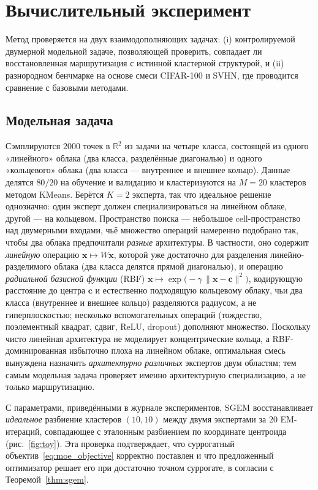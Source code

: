 \chapter{Вычислительный эксперимент}
\label{ch:experiments}

Метод проверяется на двух взаимодополняющих задачах: (i) контролируемой
двумерной модельной задаче, позволяющей проверить, совпадает ли
восстановленная маршрутизация с истинной кластерной структурой, и
(ii) разнородном бенчмарке на основе смеси CIFAR-100 и SVHN, где
проводится сравнение с базовыми методами.

\section{Модельная задача}
\label{sec:toy}

Сэмплируются $2000$ точек в $\mathbb{R}^2$ из задачи на четыре класса,
состоящей из одного «линейного» облака (два класса, разделённые
диагональю) и одного «кольцевого» облака (два класса --- внутреннее и
внешнее кольцо). Данные делятся $80/20$ на обучение и валидацию и
кластеризуются на $M = 20$ кластеров методом KMeans. Берётся $K = 2$
эксперта, так что идеальное решение однозначно: один эксперт должен
специализироваться на линейном облаке, другой --- на кольцевом.
Пространство поиска --- небольшое cell-пространство над двумерными
входами, чьё множество операций намеренно подобрано так, чтобы два
облака предпочитали \emph{разные} архитектуры. В частности, оно
содержит \emph{линейную} операцию
$\boldsymbol{x}\mapsto W\boldsymbol{x}$, которой уже достаточно для
разделения линейно-разделимого облака (два класса делятся прямой
диагональю), и операцию \emph{радиальной базисной функции} (RBF)
$\boldsymbol{x}\mapsto \exp\!\bigl(-\gamma\,\lVert\boldsymbol{x}-\boldsymbol{c}\rVert^2\bigr)$,
кодирующую расстояние до центра $\boldsymbol{c}$ и естественно подходящую
кольцевому облаку, чьи два класса (внутреннее и внешнее кольцо)
разделяются радиусом, а не гиперплоскостью; несколько вспомогательных
операций (тождество, поэлементный квадрат, сдвиг, $\mathrm{ReLU}$,
dropout) дополняют множество. Поскольку чисто линейная архитектура не
моделирует концентрические кольца, а RBF-доминированная избыточно плоха
на линейном облаке, оптимальная смесь вынуждена назначить
\emph{архитектурно различных} экспертов двум областям; тем самым
модельная задача проверяет именно архитектурную специализацию, а не
только маршрутизацию.

С параметрами, приведёнными в журнале экспериментов, SGEM восстанавливает
\emph{идеальное} разбиение кластеров $(10, 10)$ между двумя экспертами за
$20$ EM-итераций, совпадающее с эталонным разбиением по координате
центроида (рис.~\ref{fig:toy}). Эта проверка подтверждает, что
суррогатный объектив~\eqref{eq:moe_objective} корректно поставлен и что
предложенный оптимизатор решает его при достаточно точном суррогате, в
согласии с Теоремой~\ref{thm:sgem}.

